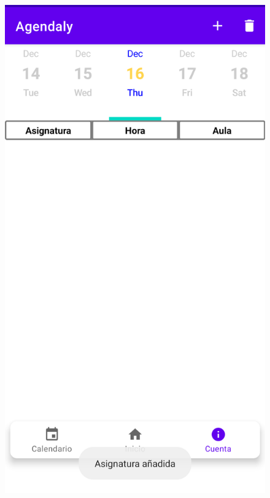 \documentclass[a4paper,openright,12pt]{article}
\begin{document}
\begin{figure}
            \includegraphics[scale=0.05]{ToastAdd.png}\hfill

\end{figure}
\end{document}
